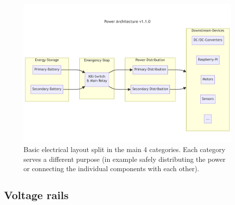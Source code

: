     \begin{figure}[h] %
        \includegraphics[width=\textwidth]{contents/figures/power-architecture-v1.1.0.png}
        \caption{Basic electrical layout split in the main 4 categories. Each category serves a different purpose (in example safely distributing the power or connecting the individual components with each other).}
         \label{power_architecture}
    \end{figure}

    \clearpage %

    \subsection{Voltage rails}

